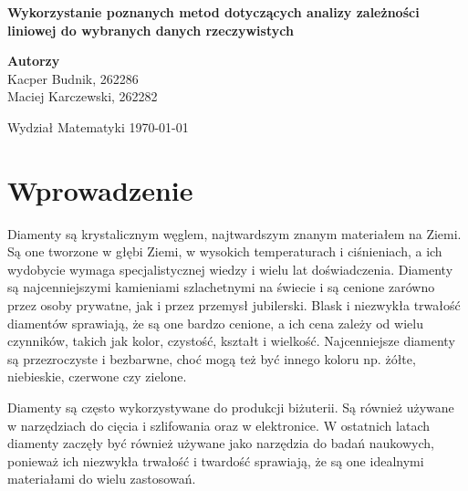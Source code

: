 \documentclass[12pt]{article}
\theoremstyle{exer}
\begin{document}
	\begin{titlepage}
		\begin{center}
			
			\textbf{\Huge  Wykorzystanie poznanych metod dotyczących analizy zależności liniowej
				do wybranych danych rzeczywistych}
			
			\vspace{0.5cm}
			
			\vspace{1.5cm}
			
			\textbf{\LARGE Autorzy}\\
			\vspace{0.5cm}
			\large Kacper Budnik, 262286\\
			\large Maciej Karczewski, 262282\\
			
			
			\vfill
			
			\vspace{0.4cm}
			

			
			\vspace{0.8cm}
			Wydział Matematyki	
			\today
		\end{center}
	\end{titlepage}
	\tableofcontents
	\newpage
	
	\section{Wprowadzenie}
	Diamenty są krystalicznym węglem, najtwardszym znanym materiałem na Ziemi. Są one tworzone w głębi Ziemi, w wysokich temperaturach i ciśnieniach, a ich wydobycie wymaga specjalistycznej wiedzy i wielu lat doświadczenia. Diamenty są najcenniejszymi kamieniami szlachetnymi na świecie i są cenione zarówno przez osoby prywatne, jak i przez przemysł jubilerski. Blask i niezwykła trwałość diamentów sprawiają, że są one bardzo cenione, a ich cena zależy od wielu czynników, takich jak kolor, czystość, kształt i wielkość. Najcenniejsze diamenty są przezroczyste i bezbarwne, choć mogą też być innego koloru np.  żółte, niebieskie, czerwone czy zielone.
	
	Diamenty są często wykorzystywane do produkcji biżuterii. Są również używane  w  narzędziach do cięcia i szlifowania oraz w elektronice. W ostatnich latach diamenty zaczęły być również używane jako narzędzia do badań naukowych, ponieważ ich niezwykła trwałość i twardość sprawiają, że są one idealnymi materiałami do wielu zastosowań.
	
\end{document}
